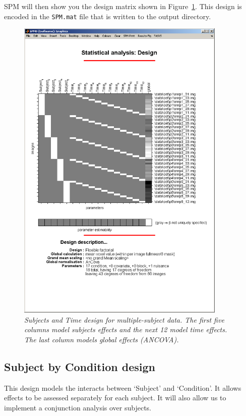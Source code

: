 SPM will then show you the design matrix shown in Figure~\ref{st_design}. This design is encoded in the \texttt{SPM.mat} file that is written to the output directory.
\begin{figure}
\begin{center}
\includegraphics[width=100mm]{pet/st_design}
\caption{\em Subjects and Time design for multiple-subject data. The first five columns model subjects effects and the next 12 model time effects. The last column models global effects (ANCOVA).  \label{st_design}}
\end{center}
\end{figure}

\subsection{Subject by Condition design}

This design models the interacts between `Subject' and `Condition'. It allows effects to be assessed separately for each subject. It will also allow us to implement
a conjunction analysis over subjects.

